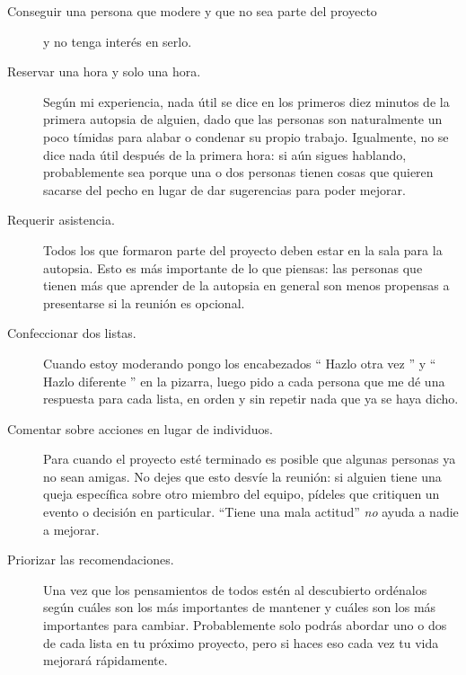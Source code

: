 \begin{description}

\item[Conseguir una persona que modere y que no sea parte del proyecto]
  y no tenga interés en serlo.

\item[Reservar una hora y solo una hora.]
  Según mi experiencia,
  nada útil se dice en los primeros diez minutos de la primera autopsia de alguien,
  dado que las personas son naturalmente un poco tímidas para alabar o condenar su propio trabajo.
  Igualmente,
  no se dice nada útil después de la primera hora:
  si aún sigues hablando,
  probablemente sea porque una o dos personas
  tienen cosas que quieren sacarse del pecho
  en lugar de dar sugerencias para poder mejorar.

\item[Requerir asistencia.]
  Todos los que formaron parte del proyecto deben estar en la sala para la autopsia.
  Esto es más importante de lo que piensas:
  las personas que tienen más que aprender de la autopsia
  en general son menos propensas a presentarse si la reunión es opcional.

\item[Confeccionar dos listas.]
  Cuando estoy moderando
  pongo los encabezados `` Hazlo otra vez '' y `` Hazlo diferente '' en la pizarra,
  luego pido a cada persona que me dé una respuesta para cada lista, en orden y 
  sin repetir nada que ya se haya dicho.

\item[Comentar sobre acciones en lugar de individuos.]
  Para cuando el proyecto esté terminado
  es posible que algunas personas ya no sean amigas.
  No dejes que esto desvíe la reunión:
  si alguien tiene una queja específica sobre otro miembro del equipo,
  pídeles que critiquen un evento o decisión en particular.
  ``Tiene una mala actitud'' \emph{no} ayuda a nadie a mejorar.

\item[Priorizar las recomendaciones.]
  Una vez que los pensamientos de todos estén al descubierto
  ordénalos según cuáles son los más importantes de mantener
  y cuáles son los más importantes para cambiar.
  Probablemente solo podrás abordar uno o dos de cada lista en tu próximo proyecto,
  pero si haces eso cada vez
  tu vida mejorará rápidamente.

\end{description}

